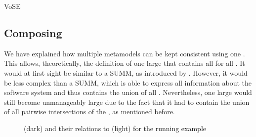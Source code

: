 \begin{copiedFrom}{VoSE}


\subsection{Composing \commonalities}

We have explained how multiple metamodels can be kept consistent using one \conceptmetamodel.
This allows, theoretically, the definition of one large \conceptmetamodel that contains all \commonalities for all \concretemetamodels.
It would at first sight be similar to a \ac{SUMM}, as introduced by \textcite{atkinson2010a}.
However, it would be less complex than a \ac{SUMM}, which is able to express all information about the software system and thus contains the union of all \concretemetamodels.
Nevertheless, one large \conceptmetamodel would still become unmanageably large due to the fact that it had to contain the union of all pairwise intersections of the \concretemetamodels, as mentioned before.

\begin{figure}
    \centering
    
    \caption{\Conceptmetamodels (dark) and their relations to \concretemetamodels (light) for the running example}
    \label{fig:quality:composed_commonalities_example}
\end{figure}


\end{copiedFrom}
